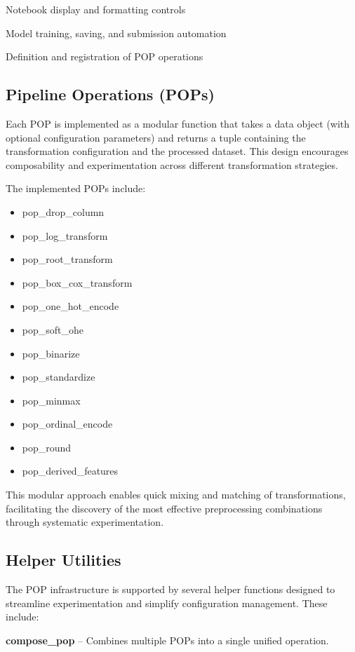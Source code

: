 Notebook display and formatting controls

Model training, saving, and submission automation

Definition and registration of POP operations

\subsection{Pipeline Operations (POPs)}\label{subsec:pipeline-operations-(pops)}
Each POP is implemented as a modular function that takes a data object (with optional configuration parameters) and returns a tuple containing the transformation configuration and the processed dataset.
This design encourages composability and experimentation across different transformation strategies.

The implemented POPs include:

\begin{itemize}
    \item pop\_drop\_column
    \item pop\_log\_transform
    \item pop\_root\_transform
    \item pop\_box\_cox\_transform
    \item pop\_one\_hot\_encode
    \item pop\_soft\_ohe
    \item pop\_binarize
    \item pop\_standardize
    \item pop\_minmax
    \item pop\_ordinal\_encode
    \item pop\_round
    \item pop\_derived\_features
\end{itemize}

This modular approach enables quick mixing and matching of transformations, facilitating the discovery of the most effective preprocessing combinations through systematic experimentation.

\subsection{Helper Utilities}\label{subsec:helper-utilities}
The POP infrastructure is supported by several helper functions designed to streamline experimentation and simplify configuration management.
These include:

\textbf{compose\_pop} – Combines multiple POPs into a single unified operation.

